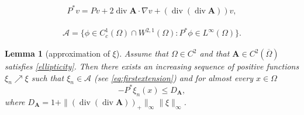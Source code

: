\documentclass[10pt,a4paper]{amsart}
\newtheorem{lemma}{Lemma}
\newcommand{\A}{\mathbf{A}}
\newcommand*\Div{\operatorname{div}}
\begin{document}
\begin{align} \label{eq:P*non-div-P}
    P^*v = Pv + 2\Div \A \cdot \nabla v + (\Div(\Div \A))v,
\end{align}

\begin{align}\label{eq:firstextension}
    \mathcal{A} = \{\phi\in C^1_c(\Omega)\cap W^{2,1}(\Omega): P^*\phi\in L^\infty(\Omega)\}.
\end{align}

\begin{lemma}[approximation of $\xi$]\label{lem:specialxi}
    Assume that $\Omega \in C^{2}$ and that $\A\in C^{2}(\overline{\Omega})$ satisfies \eqref{ellipticity}. Then there exists an increasing sequence of positive functions $\xi_n\nearrow \xi$ such that $\xi_n \in \mathcal{A}$ (see \eqref{eq:firstextension}) 
    and for almost every $x\in \Omega$
    $$
        -P^*\xi_n (x) \le D_{\A},
    $$
    where  $D_{\A}=  1+ \| (\Div(\Div\A ))_+\|_{\infty}\|\xi\|_\infty$.
\end{lemma}
\end{document}
